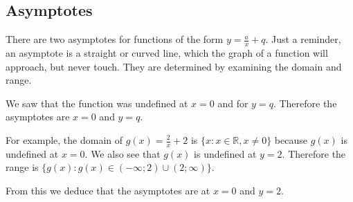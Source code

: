 \subsection*{Asymptotes}
\nopagebreak
There are two asymptotes for functions of the form $y=\frac{a}{x}+q$. Just a reminder, an asymptote is a straight or curved line, which the graph of a function will approach, but never touch. They are determined by examining the domain and range.\par 
We saw that the function was undefined at $x=0$ and for $y=q$. Therefore the asymptotes are $x=0$ and $y=q$.\par 
For example, the domain of $g(x)=\frac{2}{x}+2$ is $\{x:x\in \mathbb{R},x\ne 0\}$ because $g(x)$ is undefined at $x=0$. We also see that $g(x)$ is undefined at $y=2$. Therefore the range is $\{g(x):g(x)\in (-\infty ;2)\cup (2;\infty )\}$.\par 
From this we deduce that the asymptotes are at $x=0$ and $y=2$.\par 

